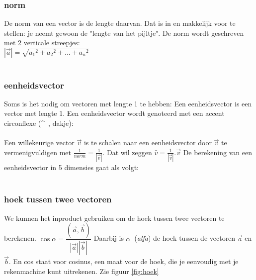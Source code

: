 \documentclass[hidelinks, a4wide, 12pt,  twoside]{book}
\begin{document}
\subsubsection{norm}
De norm van een vector is de lengte daarvan. Dat is in \RD en \RT makkelijk  voor te stellen: je neemt gewoon de "lengte van het pijltje". De norm wordt geschreven met 2 verticale streepjes:\\

{$|\vec{a}| = \sqrt{ {a_1}^{2} + {a_2}^{2} + . . . +{a_n}^{2}}$\\ \\}


\subsubsection{eenheidsvector}
Soms is het nodig om vectoren met lengte 1 te hebben:
{Een eenheidsvector is een vector met lengte 1.}
Een eenheidsvector wordt genoteerd met een accent circonflexe (\textasciicircum \ , dakje):\\ 

\\ 
Een willekeurige vector $ \vec{v} $  is te schalen naar een eenheidsvector door $ \vec{v} $   te vermenigvuldigen met $ \frac{1}{norm} =  \frac{1}{ |\vec{v}|} $. 
Dat wil zeggen $\hat{v} =  \frac{1}{ |\vec{v}|}.\vec{v} $
De berekening van een eenheidsvector in 5 dimensies gaat als volgt: \\ \\


\subsubsection{hoek tussen twee vectoren}
We kunnen het inproduct gebruiken om de hoek tussen twee vectoren te berekenen. 
{\quad  
	$\cos \alpha = \dfrac{(\vec{a}, \vec{b}) }{|\vec{a}| |\vec{b}|} $}
Daarbij is $\alpha \ $ (\textit{alfa}) de hoek tussen de vectoren $\vec{a}$ en $\vec{b}.$ En cos staat voor cosinus, een maat voor de hoek, die je eenvoudig met je rekenmachine kunt uitrekenen. Zie figuur \ref{fig:hoek}  \\ \\
\end{document}
